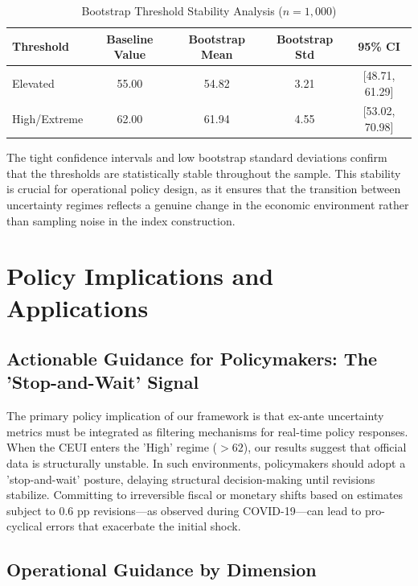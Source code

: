 \documentclass[12pt,a4paper]{article}
\theoremstyle{remark}
\begin{document}
\begin{table}[h]
\centering
\begin{threeparttable}
\caption{Bootstrap Threshold Stability Analysis ($n = 1{,}000$)}
\label{tab:robustness_thresholds}
\begin{tabular}{lcccc}
\toprule
Threshold & Baseline Value & Bootstrap Mean & Bootstrap Std & 95\% CI \\
\midrule
Elevated & 55.00 & 54.82 & 3.21 & [48.71, 61.29] \\
High/Extreme & 62.00 & 61.94 & 4.55 & [53.02, 70.98] \\
\bottomrule
\end{tabular}
\end{threeparttable}
\end{table}

The tight confidence intervals and low bootstrap standard deviations confirm that the thresholds are statistically stable throughout the sample. This stability is crucial for operational policy design, as it ensures that the transition between uncertainty regimes reflects a genuine change in the economic environment rather than sampling noise in the index construction.

\section{Policy Implications and Applications}

\subsection{Actionable Guidance for Policymakers: The 'Stop-and-Wait' Signal}

The primary policy implication of our framework is that ex-ante uncertainty metrics must be integrated as filtering mechanisms for real-time policy responses. When the CEUI enters the 'High' regime ($>62$), our results suggest that official data is structurally unstable. In such environments, policymakers should adopt a 'stop-and-wait' posture, delaying structural decision-making until revisions stabilize. Committing to irreversible fiscal or monetary shifts based on estimates subject to 0.6 pp revisions—as observed during COVID-19—can lead to pro-cyclical errors that exacerbate the initial shock.

\subsection{Operational Guidance by Dimension}
\end{document}
